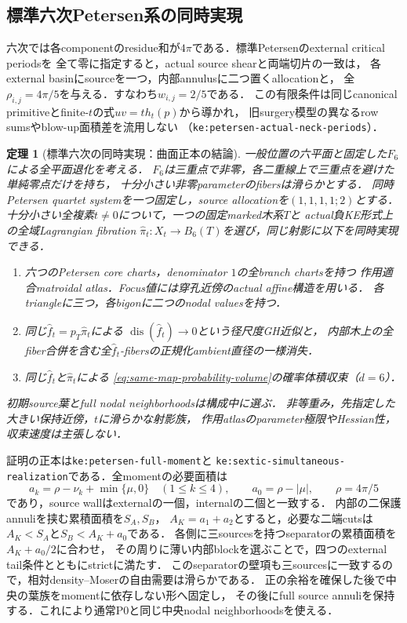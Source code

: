 \documentclass[a4paper,11pt]{ltjsarticle}
\numberwithin{equation}{section}
\theoremstyle{plain}
\newtheorem{theorem}{定理}[section]
\theoremstyle{definition}
\theoremstyle{remark}
\begin{document}
\subsection{標準六次Petersen系の同時実現}
\label{sec:sextic-simultaneous}

六次では各componentのresidue和が$4\pi$である．標準Petersenのexternal critical periodsを
全て零に指定すると，actual source shearと両端切片の一致は，
各external basinにsourceを一つ，内部annulusに二つ置くallocationと，
全$\rho_{i,j}=4\pi/5$を与える．すなわち$w_{i,j}=2/5$である．
この有限条件は同じcanonical primitiveとfinite-$t$の式$uv=t h_t(p)$から導かれ，
旧surgery模型の異なるrow sumsやblow-up面積差を流用しない
（\texttt{ke:petersen-actual-neck-periods}）．

\begin{theorem}[標準六次の同時実現：曲面正本の結論]
\label{thm:sextic-simultaneous-summary}
一般位置の六平面と固定した$F_6$による全平面退化を考える．
$F_6$は三重点で非零，各二重線上で三重点を避けた単純零点だけを持ち，
十分小さい非零parameterのfibersは滑らかとする．
同時Petersen quartet systemを一つ固定し，source allocationを$(1,1,1,1;2)$とする．
十分小さい全複素$t\ne0$について，一つの固定marked木系$T$と
actual負KE形式上の全域Lagrangian fibration
$\widehat\pi_t:X_t\to B_6(T)$を選び，同じ射影に以下を同時実現できる．
\begin{enumerate}
\item 六つのPetersen core charts，denominator $1$の全branch chartsを持つ
作用適合matroidal atlas．Focus値には穿孔近傍のactual affine構造を用いる．
各triangleに三つ，各bigonに二つのnodal valuesを持つ．
\item 同じ$\widehat f_t=p_T\widehat\pi_t$による
$\operatorname{dis}(\widehat f_t)\to0$という径尺度GH近似と，
内部木上の全fiber合併を含む全$\widehat f_t$-fibersの正規化ambient直径の一様消失．
\item 同じ$\widehat f_t$と$\widehat\pi_t$による
\eqref{eq:same-map-probability-volume}の確率体積収束（$d=6$）．
\end{enumerate}
初期source葉とfull nodal neighborhoodsは構成中に選ぶ．
非等重み，先指定した大きい保持近傍，$t$に滑らかな射影族，
作用atlasのparameter極限やHessian性，収束速度は主張しない．
\end{theorem}

証明の正本は\texttt{ke:petersen-full-moment}と
\texttt{ke:sextic-simultaneous-realization}である．全momentの必要面積は
\[
 a_k=\rho-\nu_k+\min\{\mu,0\}\quad(1\le k\le4),
 \qquad a_0=\rho-|\mu|,\qquad \rho=4\pi/5
\]
であり，source wallはexternalの一個，internalの二個と一致する．
内部の二保護annuliを挟む累積面積を$S_A,S_B$，
$A_K=a_1+a_2$とすると，必要な二端cutsは
$A_K<S_A$と$S_B<A_K+a_0$である．
各側に三sourcesを持つseparatorの累積面積を$A_K+a_0/2$に合わせ，
その周りに薄い内部blockを選ぶことで，四つのexternal tail条件とともにstrictに満たす．
このseparatorの壁項も三sourcesに一致するので，相対density--Moserの自由需要は滑らかである．
正の余裕を確保した後で中央の葉族をmomentに依存しない形へ固定し，
その後にfull source annuliを保持する．これにより通常P0と同じ中央nodal neighborhoodsを使える．
\end{document}
